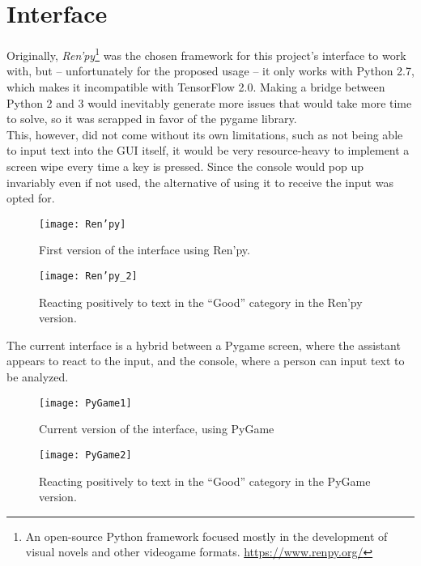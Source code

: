 \section{Interface}
Originally, \textit{Ren'py}\footnote{An open-source Python framework focused mostly in the development of visual novels and other videogame formats. \url{https://www.renpy.org/}} was the chosen framework for this project's interface to work with, but -- unfortunately for the proposed usage -- it only works with Python 2.7, which makes it incompatible with TensorFlow 2.0. Making a bridge between Python 2 and 3 would inevitably generate more issues that would take more time to solve, so it was scrapped in favor of the pygame library. \\

This, however, did not come without its own limitations, such as not being able to input text into the GUI itself, it would be very resource-heavy to implement a screen wipe every time a key is pressed. Since the console would pop up invariably even if not used, the alternative of using it to receive the input was opted for.
\pagebreak

\begin{figure}[!h]
	\centering
	\texttt{[image: Ren'py]}
	\caption{First version of the interface using Ren'py.}
	\label{fig:renpy_test_1}
\end{figure}
\begin{figure}[!h]
	\centering
	\texttt{[image: Ren'py\_2]}
	\caption{Reacting positively to text in the ``Good'' category in the Ren'py version.}
	\label{fig:renpy_test_2}
\end{figure}

The current interface is a hybrid between a Pygame screen, where the assistant appears to react to the input, and the console, where a person can input text to be analyzed.

\begin{figure}[!h]
	\centering
	\texttt{[image: PyGame1]}
	\caption{Current version of the interface, using PyGame}
	\label{fig:PyGame1}
\end{figure}
\begin{figure}[!h]
	\centering
	\texttt{[image: PyGame2]}
	\caption{Reacting positively to text in the ``Good'' category in the PyGame version.}
	\label{fig:PyGame2}
\end{figure}

